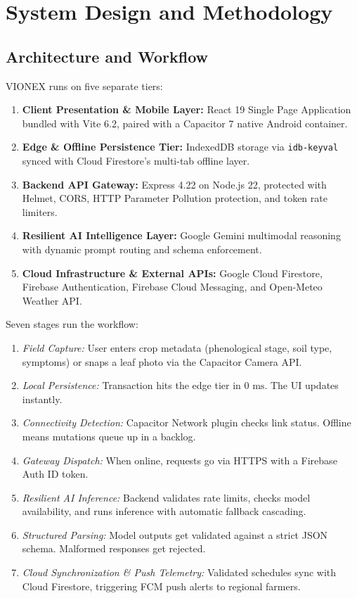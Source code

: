 \documentclass[conference]{IEEEtran}
\begin{document}
\section{System Design and Methodology}

\subsection{Architecture and Workflow}
VIONEX runs on five separate tiers:
\begin{enumerate}
    \item \textbf{Client Presentation \& Mobile Layer:} React 19 Single Page Application bundled with Vite 6.2, paired with a Capacitor 7 native Android container.
    \item \textbf{Edge \& Offline Persistence Tier:} IndexedDB storage via \texttt{idb-keyval} synced with Cloud Firestore's multi-tab offline layer.
    \item \textbf{Backend API Gateway:} Express 4.22 on Node.js 22, protected with Helmet, CORS, HTTP Parameter Pollution protection, and token rate limiters.
    \item \textbf{Resilient AI Intelligence Layer:} Google Gemini multimodal reasoning with dynamic prompt routing and schema enforcement.
    \item \textbf{Cloud Infrastructure \& External APIs:} Google Cloud Firestore, Firebase Authentication, Firebase Cloud Messaging, and Open-Meteo Weather API.
\end{enumerate}

Seven stages run the workflow:
\begin{enumerate}
    \item \textit{Field Capture:} User enters crop metadata (phenological stage, soil type, symptoms) or snaps a leaf photo via the Capacitor Camera API.
    \item \textit{Local Persistence:} Transaction hits the edge tier in $0\text{ ms}$. The UI updates instantly.
    \item \textit{Connectivity Detection:} Capacitor Network plugin checks link status. Offline means mutations queue up in a backlog.
    \item \textit{Gateway Dispatch:} When online, requests go via HTTPS with a Firebase Auth ID token.
    \item \textit{Resilient AI Inference:} Backend validates rate limits, checks model availability, and runs inference with automatic fallback cascading.
    \item \textit{Structured Parsing:} Model outputs get validated against a strict JSON schema. Malformed responses get rejected.
    \item \textit{Cloud Synchronization \& Push Telemetry:} Validated schedules sync with Cloud Firestore, triggering FCM push alerts to regional farmers.
\end{enumerate}
\end{document}
